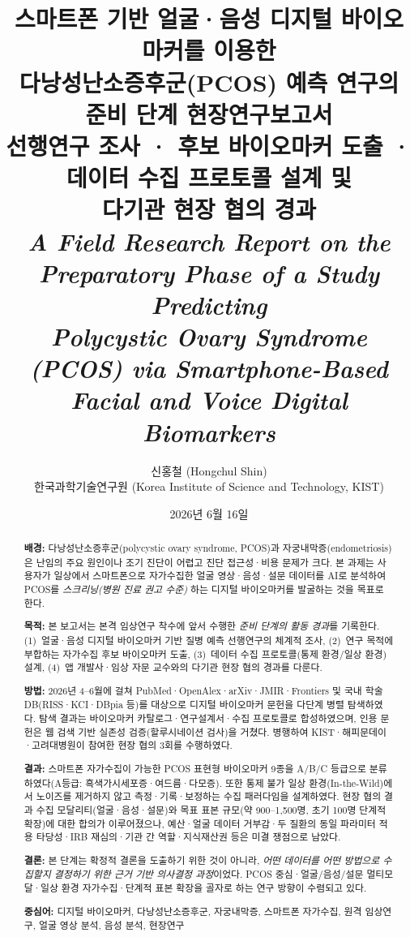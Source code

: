 \documentclass[11pt,a4paper]{article}
\title{\vspace{-1.0cm}\bfseries
스마트폰 기반 얼굴·음성 디지털 바이오마커를 이용한\\
다낭성난소증후군(PCOS) 예측 연구의 준비 단계 현장연구보고서\\[0.3em]
\large 선행연구 조사 · 후보 바이오마커 도출 · 데이터 수집 프로토콜 설계 및\\
\large 다기관 현장 협의 경과\\[0.5em]
\normalsize\itshape A Field Research Report on the Preparatory Phase of a Study Predicting\\
\normalsize\itshape Polycystic Ovary Syndrome (PCOS) via Smartphone-Based Facial and Voice Digital Biomarkers}
\author{신홍철 (Hongchul Shin)\\
\small 한국과학기술연구원 (Korea Institute of Science and Technology, KIST)}
\date{2026년 6월 16일}
\begin{document}
\maketitle

\begin{abstract}
\noindent
\textbf{배경:} 다낭성난소증후군(polycystic ovary syndrome, PCOS)과 자궁내막증(endometriosis)은 난임의 주요 원인이나 조기 진단이 어렵고 진단 접근성·비용 문제가 크다. 본 과제는 사용자가 일상에서 스마트폰으로 자가수집한 얼굴 영상·음성·설문 데이터를 AI로 분석하여 PCOS를 \emph{스크리닝(병원 진료 권고 수준)} 하는 디지털 바이오마커를 발굴하는 것을 목표로 한다.

\smallskip
\noindent
\textbf{목적:} 본 보고서는 본격 임상연구 착수에 앞서 수행한 \emph{준비 단계의 활동 경과}를 기록한다. (1)~얼굴·음성 디지털 바이오마커 기반 질병 예측 선행연구의 체계적 조사, (2)~연구 목적에 부합하는 자가수집 후보 바이오마커 도출, (3)~데이터 수집 프로토콜(통제 환경/일상 환경) 설계, (4)~앱 개발사·임상 자문 교수와의 다기관 현장 협의 경과를 다룬다.

\smallskip
\noindent
\textbf{방법:} 2026년 4{--}6월에 걸쳐 PubMed·OpenAlex·arXiv·JMIR·Frontiers 및 국내 학술 DB(RISS·KCI·DBpia 등)를 대상으로 디지털 바이오마커 문헌을 다단계 병렬 탐색하였다. 탐색 결과는 바이오마커 카탈로그·연구설계서·수집 프로토콜로 합성하였으며, 인용 문헌은 웹 검색 기반 실존성 검증(할루시네이션 검사)을 거쳤다. 병행하여 KIST·해피문데이·고려대병원이 참여한 현장 협의 3회를 수행하였다.

\smallskip
\noindent
\textbf{결과:} 스마트폰 자가수집이 가능한 PCOS 표현형 바이오마커 9종을 A/B/C 등급으로 분류하였다(A등급: 흑색가시세포증·여드름·다모증). 또한 통제 불가 일상 환경(In-the-Wild)에서 노이즈를 제거하지 않고 측정·기록·보정하는 수집 패러다임을 설계하였다. 현장 협의 결과 수집 모달리티(얼굴·음성·설문)와 목표 표본 규모(약 900{--}1{,}500명, 초기 100명 단계적 확장)에 대한 합의가 이루어졌으나, 예산·얼굴 데이터 거부감·두 질환의 동일 파라미터 적용 타당성·IRB 재심의·기관 간 역할·지식재산권 등은 미결 쟁점으로 남았다.

\smallskip
\noindent
\textbf{결론:} 본 단계는 확정적 결론을 도출하기 위한 것이 아니라, \emph{어떤 데이터를 어떤 방법으로 수집할지 결정하기 위한 근거 기반 의사결정 과정}이었다. PCOS 중심·얼굴/음성/설문 멀티모달·일상 환경 자가수집·단계적 표본 확장을 골자로 하는 연구 방향이 수렴되고 있다.

\smallskip
\noindent
\textbf{중심어:} 디지털 바이오마커, 다낭성난소증후군, 자궁내막증, 스마트폰 자가수집, 원격 임상연구, 얼굴 영상 분석, 음성 분석, 현장연구
\end{abstract}
\end{document}
